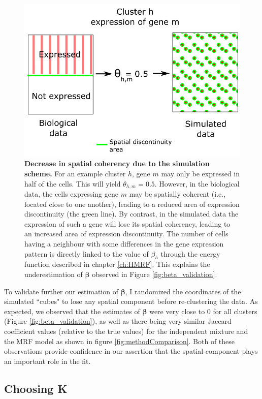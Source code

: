	\begin{figure}[H]
\centerline{\includegraphics[width=0.6\linewidth]{gfx/chapter5/beta_error.png}}
\caption{{\bf Decrease in spatial coherency due to the simulation scheme.} For an example cluster $h$, gene $m$ may only be expressed in half of the cells. This will yield $\theta_{h,m} = 0.5$. However, in the biological data, the cells expressing gene $m$ may be spatially coherent (i.e., located close to one another), leading to a reduced area of expression discontinuity (the green line). By contrast, in the simulated data the expression of such a gene will lose its spatial coherency, leading to an increased area of expression discontinuity. The number of cells having a neighbour with some differences in the gene expression pattern is directly linked to the value of $\beta_h$ through the energy function described in chapter \ref{ch:HMRF}. This explains the underestimation of $\boldsymbol{\beta}$ observed in Figure \ref{fig:beta_validation}.}
\label{fig:beta_error}
	\end{figure}

To validate further our estimation of $\boldsymbol{\beta}$, I randomized the coordinates of the simulated ``cubes" to lose any spatial component before re-clustering the data. As expected, we observed that the estimates of $\boldsymbol{\beta}$ were very close to $0$ for all clusters (Figure \ref{fig:beta_validation}), as well as there being very similar Jaccard coefficient values (relative to the true values) for the independent mixture and the MRF model as shown in figure \ref{fig:methodComparison}. Both of these observations provide confidence in our assertion that the spatial component plays an important role in the fit.\\
	
	\subsection{Choosing K}
	
